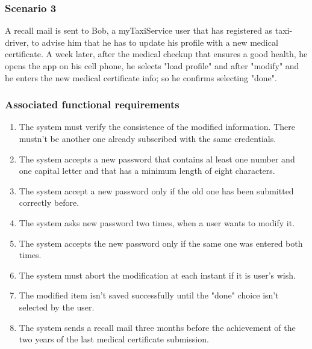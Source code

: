 \subsubsection{Scenario 3}
A recall mail is sent to Bob, a myTaxiService user that has registered as taxi-driver, to advise him that he has to update his profile with a new medical certificate. A week later, after the medical checkup that ensures a good health, he opens the app on his cell phone, he selects "load profile" and after "modify" and he enters the new medical certificate info; so he confirms selecting "done".

\subsubsection{Associated functional requirements}
\begin{enumerate}
\item The system must verify the consistence of the modified information. There mustn't be another one already subscribed with the same credentials.
\item The system accepts a new password that contains al least one number and one capital letter and that has a minimum length of eight characters.
\item The system accept a new password only if the old one has been submitted correctly before.
\item The system asks new password two times, when a user wants to modify it.
\item The system accepts the new password only if the same one was entered both times.
\item The system must abort the modification at each instant if it is user's wish.
\item The modified item isn't saved successfully until the "done" choice isn't selected by the user.
\item The system sends a recall mail three months before the achievement of the two years of the last medical certificate submission.
\end{enumerate}




